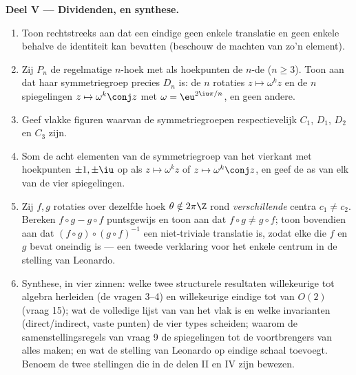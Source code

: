 \begin{problem}
\medskip
\noindent\textbf{Deel V --- Dividenden, en synthese.}
\begin{enumerate}[resume]
  \item Toon rechtstreeks aan dat een eindige  
        geen enkele translatie en geen enkele 
        behalve de identiteit kan bevatten (beschouw de machten van
        zo'n element).
  \item Zij $P_n$ de regelmatige $n$-hoek met als hoekpunten de
        $n$-de  ($n \geq 3$). Toon aan dat haar
        symmetriegroep precies $D_n$ is: de $n$ rotaties $z \mapsto
        \omega^k z$ en de $n$ spiegelingen $z \mapsto \omega^k
        \conj z$ met $\omega = \eu^{2\iu\pi/n}$, en geen andere.
  \item Geef vlakke figuren waarvan de symmetriegroepen
        respectievelijk $C_1$, $D_1$, $D_2$ en $C_3$ zijn.
  \item Som de acht elementen van de symmetriegroep van het
        vierkant met hoekpunten $\pm1, \pm\iu$ op als 
        $z \mapsto \omega^k z$ of $z \mapsto \omega^k\conj z$, en
        geef de as van elk van de vier spiegelingen.
  \item Zij $f, g$ rotaties over dezelfde hoek $\theta \notin
        2\pi\Z$ rond \emph{verschillende} centra $c_1 \neq c_2$.
        Bereken $f\circ g - g\circ f$ puntsgewijs en toon aan dat
        $f\circ g \neq g\circ f$; toon bovendien aan dat $(f \circ
        g)\circ(g\circ f)^{-1}$ een niet-triviale translatie is,
        zodat elke  die $f$ en $g$ bevat oneindig is --- een
        tweede verklaring voor het enkele centrum in de stelling
        van Leonardo.
  \item Synthese, in vier zinnen: welke twee structurele
        resultaten willekeurige  tot  algebra
        herleiden (de vragen 3--4) en willekeurige eindige 
        tot  van $O(2)$ (vraag 15); wat de volledige
        lijst van  van het vlak is en welke invarianten
        (direct/indirect, vaste punten) de vier types scheiden;
        waarom de samenstellingsregels van vraag 9 de spiegelingen
        tot de voortbrengers van alles maken; en wat de stelling
        van Leonardo op eindige schaal toevoegt. Benoem de twee
        stellingen die in de delen II en IV zijn bewezen.
\end{enumerate}
\end{problem}
